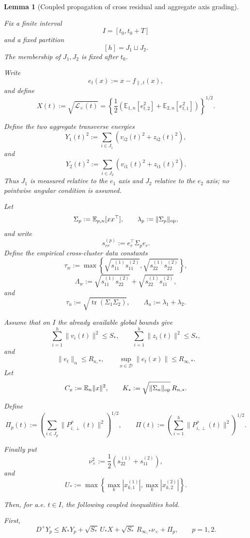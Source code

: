 \documentclass{article} %
\theoremstyle{plain}
\newtheorem{lemma}[theorem]{Lemma}
\theoremstyle{definition}
\theoremstyle{remark}
\begin{document}
\begin{lemma}[Coupled propagation of cross residual and aggregate axis grading]
\label{sbagg:lem:coupled-cross-transverse}

Fix a finite interval
\[
I=[t_0,t_0+T]
\]
and a fixed partition
\[
[h]=J_1\sqcup J_2.
\]
The membership of $J_1,J_2$ is fixed after $t_0$.

Write
\[
e_t(x):=x-f_{\parallel,t}(x),
\]
and define
\[
X(t)
:=
\sqrt{\mathcal L_\times(t)}
=
\left\{
\frac12
\left(
\mathbb E_{1,n}[e_{t,2}^2]
+
\mathbb E_{2,n}[e_{t,1}^2]
\right)
\right\}^{1/2}.
\]

Define the two aggregate transverse energies
\[
\boxed{
Y_1(t)^2
:=
\sum_{i\in J_1}
\left(
v_{i2}(t)^2+z_{i2}(t)^2
\right),
}
\]
and
\[
\boxed{
Y_2(t)^2
:=
\sum_{i\in J_2}
\left(
v_{i1}(t)^2+z_{i1}(t)^2
\right).
}
\]
Thus $J_1$ is measured relative to the $e_1$ axis and $J_2$ relative to
the $e_2$ axis; no pointwise angular condition is assumed.

Let
\[
\Sigma_p
:=
\mathbb E_{p,n}[xx^\top],
\qquad
\lambda_p:=\|\Sigma_p\|_{\rm op},
\]
and write
\[
s_{rr}^{(p)}:=e_r^\top\Sigma_pe_r.
\]
Define the empirical cross-cluster data constants
\[
\boxed{
\tau_w
:=
\max\left\{
\sqrt{s_{11}^{(1)}s_{11}^{(2)}},
\sqrt{s_{22}^{(1)}s_{22}^{(2)}}
\right\},
}
\]
\[
\boxed{
\Lambda_w
:=
\sqrt{s_{11}^{(1)}s_{22}^{(2)}}
+
\sqrt{s_{22}^{(1)}s_{11}^{(2)}},
}
\]
and
\[
\boxed{
\tau_u
:=
\sqrt{\operatorname{tr}(\Sigma_1\Sigma_2)},
\qquad
\Lambda_u:=\lambda_1+\lambda_2.
}
\]

Assume that on $I$ the already available global bounds give
\[
\sum_{i=1}^h\|v_i(t)\|^2\le S_*,
\qquad
\sum_{i=1}^h\|z_i(t)\|^2\le S_*,
\tag{mass-ceiling}
\label{sbagg:eq:coupled-mass-ceiling}
\]
and
\[
\|e_t\|_n\le R_{n,*},
\qquad
\sup_{x\in\mathcal D}\|e_t(x)\|\le R_{\infty,*}.
\tag{residual-ceiling}
\label{sbagg:eq:coupled-residual-ceiling}
\]
Let
\[
C_x:=\mathbb E_n\|x\|^2,
\qquad
K_*:=\sqrt{\|\Sigma_n\|_{\rm op}}\,R_{n,*}.
\]

Define
\[
\Pi_p(t)
:=
\left(
\sum_{i\in J_p}
\|P_{i,\perp}^\rho(t)\|^2
\right)^{1/2},
\qquad
\Pi(t)
:=
\left(
\sum_{i=1}^h
\|P_{i,\perp}^\rho(t)\|^2
\right)^{1/2}.
\]

Finally put
\[
\nu_\times^2
:=
\frac12
\left(
s_{22}^{(1)}+s_{11}^{(2)}
\right),
\]
and
\[
U_*:=
\max\left\{
\max_k|x_{k,1}^{(1)}|,
\max_k|x_{k,2}^{(2)}|
\right\}.
\]

Then, for a.e. $t\in I$, the following coupled inequalities hold.

First,
\[
\boxed{
D^+Y_p
\le
K_*Y_p
+
\sqrt{S_*}\,U_*X
+
\sqrt{S_*}\,R_{\infty,*}\nu_\times
+
\Pi_p,
\qquad
p=1,2.
}
\tag{coupled-Y}
\label{sbagg:eq:coupled-Y}
\]


\end{lemma}
\end{document}
